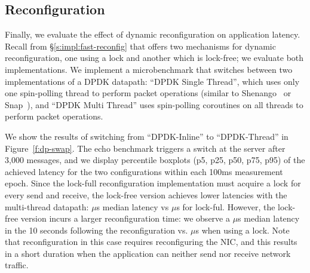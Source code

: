 \subsection{Reconfiguration}\label{s:eval:reconfig}
Finally, we evaluate the effect of dynamic reconfiguration on application latency.
Recall from \S\ref{s:impl:fast-reconfig} that \name offers two mechanisms for dynamic reconfiguration, one using a lock and another which is lock-free; we evaluate both implementations.
We implement a microbenchmark that switches between two implementations of a DPDK datapath: ``DPDK Single Thread'', which uses only one spin-polling thread to perform packet operations (similar to Shenango~\cite{shenango} or Snap~\cite{snap}), and ``DPDK Multi Thread'' uses spin-polling coroutines on all threads to perform packet operations.

We show the results of switching from ``DPDK-Inline'' to ``DPDK-Thread'' in Figure~\ref{f:dp-swap}. The echo benchmark triggers a \tunnel switch at the server after 3,000 messages, and we display percentile boxplots (p5, p25, p50, p75, p95) of the achieved latency for the two configurations within each 100ms measurement epoch.
Since the lock-full reconfiguration implementation must acquire a lock for every send and receive, the lock-free version achieves lower latencies with the multi-thread datapath: \beforeSwapDpMedianRttUs $\mu$s median latency vs \beforeSwapMuxMedianRttUs $\mu$s for lock-ful.
However, the lock-free version incurs a larger reconfiguration time: we observe a \duringSwapDpMedianRttUs $\mu$s median latency in the 10 seconds following the reconfiguration vs. \duringSwapMuxMedianRttUs $\mu$s when using a lock. Note that reconfiguration in this case requires reconfiguring the NIC, and this results in a short duration when the application can neither send nor receive network traffic.
